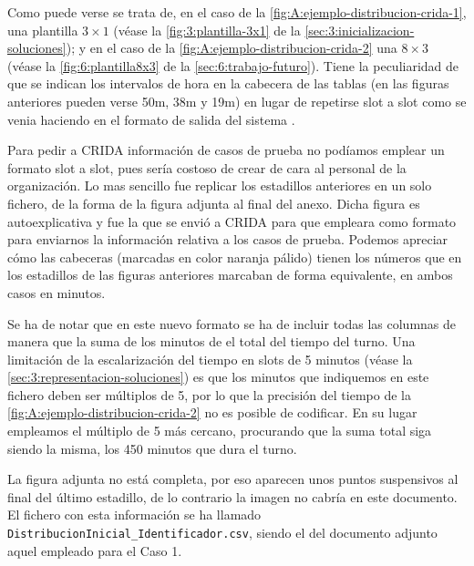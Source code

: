Como puede verse se trata de, en el caso de la \autoref{fig:A:ejemplo-distribucion-crida-1}, una plantilla $3\times1$ (véase la \autoref{fig:3:plantilla-3x1} de la \autoref{sec:3:inicializacion-soluciones}); y en el caso de la \autoref{fig:A:ejemplo-distribucion-crida-2} una $8\times3$ (véase la \autoref{fig:6:plantilla8x3} de la \autoref{sec:6:trabajo-futuro}). Tiene la peculiaridad de que se indican los intervalos de hora en la cabecera de las tablas (en las figuras anteriores pueden verse 50m, 38m y 19m) en lugar de repetirse slot a slot como se venia haciendo en el formato de salida del sistema \legacy{}. 

Para pedir a CRIDA información de casos de prueba no podíamos emplear un formato slot a slot, pues sería costoso de crear de cara al personal de la organización. Lo mas sencillo fue replicar los estadillos anteriores en un solo fichero, de la forma de la figura adjunta al final del anexo. Dicha figura es autoexplicativa y fue la que se envió a CRIDA para que empleara como formato para enviarnos la información relativa a los casos de prueba. Podemos apreciar cómo las cabeceras (marcadas en color naranja pálido) tienen los números que en los estadillos de las figuras anteriores marcaban de forma equivalente, en ambos casos en minutos.

Se ha de notar que en este nuevo formato se ha de incluir todas las columnas de manera que la suma de los minutos de el total del tiempo del turno. Una limitación de la escalarización del tiempo en slots de 5 minutos (véase la \autoref{sec:3:representacion-soluciones}) es que los minutos que indiquemos en este fichero deben ser múltiplos de 5, por lo que la precisión del tiempo de la \autoref{fig:A:ejemplo-distribucion-crida-2} no es posible de codificar. En su lugar empleamos el múltiplo de 5 más cercano, procurando que la suma total siga siendo la misma, los 450 minutos que dura el turno. 

La figura adjunta no está completa, por eso aparecen unos puntos suspensivos al final del último estadillo, de lo contrario la imagen no cabría en este documento. El fichero con esta información se ha llamado \texttt{DistribucionInicial\_Identificador.csv}, siendo el del documento adjunto aquel empleado para el Caso 1.

\begin{landscape}
	
\end{landscape}
